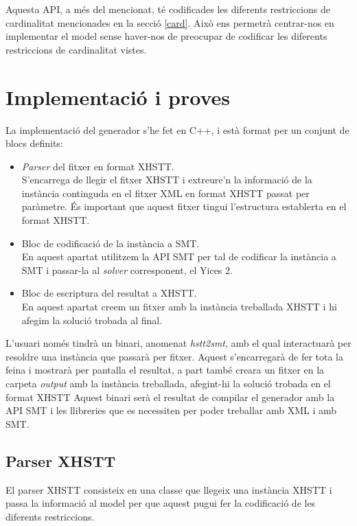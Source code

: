 \documentclass[11pt,a4paper,twoside]{report}
\begin{document}
  Aquesta API, a més del mencionat, 
  té codificades les diferents restriccions de cardinalitat mencionades en la secció \ref{card}. Això ens permetrà centrar-nos en implementar el model sense haver-nos de preocupar de codificar les diferents restriccions de cardinalitat vistes.



  

  \chapter{Implementació i proves}

  La implementació del generador s'he fet en C++, i està format per un conjunt de blocs definits:\
  \begin{itemize}
    \item \textit{Parser }del fitxer en format XHSTT. \\ S'encarrega de llegir el fitxer XHSTT i extreure'n la informació de la instància continguda en el fitxer XML en format XHSTT passat per paràmetre. És important que aquest fitxer tingui l'estructura establerta en el format XHSTT.
    \item Bloc de codificació de la instància a SMT. \\ En aquest apartat utilitzem la API SMT per tal de codificar la instància a SMT i passar-la al \textit{solver} corresponent, el Yices 2.
    \item Bloc de escriptura del resultat a XHSTT. \\ En aquest apartat creem un fitxer amb la instància treballada XHSTT i hi afegim la solució trobada al final.
  \end{itemize}

  L'usuari només tindrà un binari, anomenat \textit{hstt2smt}, amb el qual interactuarà per resoldre una instància que passarà per fitxer. Aquest s'encarregarà de fer tota la feina i mostrarà per pantalla el resultat, a part també creara un fitxer en la carpeta \textit{output} amb la instància treballada, afegint-hi la solució trobada en el format XHSTT
  Aquest binari serà el resultat de compilar el generador amb la API SMT i les llibreries que es necessiten per poder treballar amb XML i amb SMT.

  \section{Parser XHSTT}

  El parser XHSTT consisteix en una classe que llegeix una instància XHSTT i passa la informació al model per que aquest pugui fer la codificació de les diferents restriccions.
\end{document}
